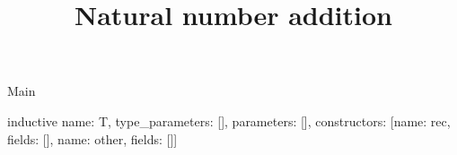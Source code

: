 \begin{lexlean}{Main}
\title{Natural number addition}
\begin{semanticmodule}
inductive{
  name: T,
  type_parameters: [],
  parameters: [],
  constructors: [{name: rec, fields: []}, {name: other, fields: []}]
}
\end{semanticmodule}
\end{lexlean}
